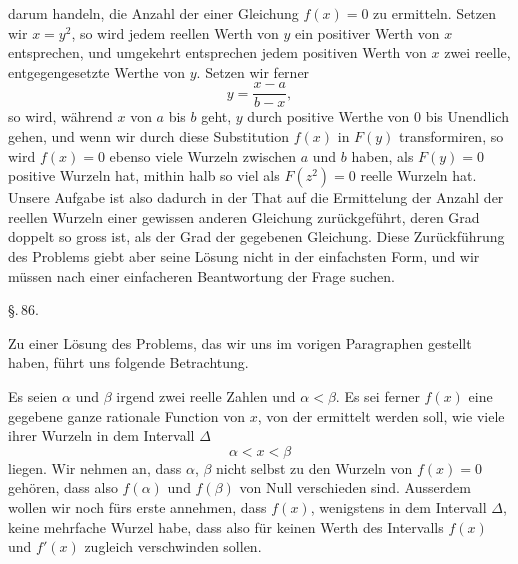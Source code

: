 darum handeln, die Anzahl der  einer Gleichung $f(x) = 0$ zu ermitteln. Setzen wir $x = y^2$, so wird jedem reellen Werth von $y$ ein positiver Werth von $x$ entsprechen, und umgekehrt entsprechen jedem positiven Werth von $x$ zwei reelle, entgegengesetzte Werthe von $y$. %
 Setzen wir ferner
\[
y = \frac{x - a}{b - x},
\]
so wird, während $x$ von $a$ bis $b$ geht, $y$ durch positive Werthe von $0$ bis Unendlich gehen, und wenn wir durch diese Substitution $f(x)$ in $F(y)$ transformiren, so wird $f(x) = 0$ ebenso viele Wurzeln zwischen $a$ und $b$ haben, als $F(y) = 0$ positive Wurzeln hat, mithin halb so viel als $F(z^2) = 0$ reelle Wurzeln hat. Unsere Aufgabe ist also dadurch in der That auf die Ermittelung der Anzahl der reellen Wurzeln einer gewissen anderen Gleichung zurückgeführt, deren Grad doppelt so gross ist, als der Grad der gegebenen Gleichung. Diese Zurückführung des Problems giebt aber seine Lösung nicht in der einfachsten Form, und wir müssen nach einer einfacheren Beantwortung der Frage suchen.

\begin{center}
\S.\,86.

\end{center}

Zu einer Lösung des Problems, das wir uns im vorigen Paragraphen gestellt haben, führt uns folgende Betrachtung.

Es seien $\alpha$ und $\beta$ irgend zwei reelle Zahlen und $\alpha < \beta$. Es sei ferner $f(x)$ eine gegebene ganze rationale Function von $x$, von der ermittelt werden soll, wie viele ihrer Wurzeln in dem Intervall $\Delta$
\[
\alpha < x < \beta
\]
liegen. Wir nehmen an, dass $\alpha$, $\beta$ nicht selbst zu den Wurzeln von $f(x) = 0$ gehören, dass also $f(\alpha)$ und $f(\beta)$ von Null verschieden sind. Ausserdem wollen wir noch fürs erste annehmen, dass $f(x)$, wenigstens in dem Intervall $\Delta$, keine mehrfache Wurzel habe, dass also für keinen Werth des Intervalls $f(x)$ und $f'(x)$ zugleich verschwinden sollen.

